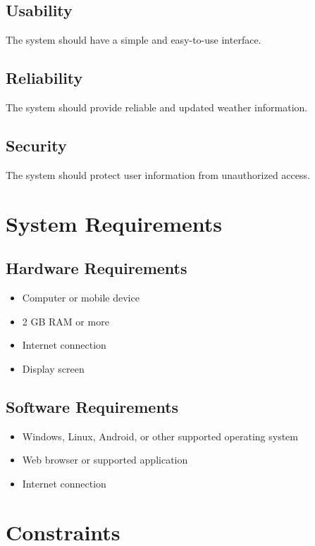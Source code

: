 \documentclass[12pt,a4paper]{article}
\begin{document}
\subsection{Usability}

The system should have a simple and easy-to-use interface.

\subsection{Reliability}

The system should provide reliable and updated weather information.

\subsection{Security}

The system should protect user information from unauthorized access.

\section{System Requirements}

\subsection{Hardware Requirements}

\begin{itemize}
\item Computer or mobile device
\item 2 GB RAM or more
\item Internet connection
\item Display screen
\end{itemize}

\subsection{Software Requirements}

\begin{itemize}
\item Windows, Linux, Android, or other supported operating system
\item Web browser or supported application
\item Internet connection
\end{itemize}

\section{Constraints}
\end{document}

